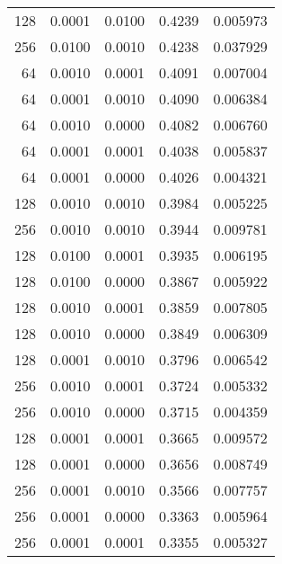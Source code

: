 \begin{tabular}{rrrrr}
 128 &  0.0001 &  0.0100 &  0.4239 &  0.005973 \\
 256 &  0.0100 &  0.0010 &  0.4238 &  0.037929 \\
  64 &  0.0010 &  0.0001 &  0.4091 &  0.007004 \\
  64 &  0.0001 &  0.0010 &  0.4090 &  0.006384 \\
  64 &  0.0010 &  0.0000 &  0.4082 &  0.006760 \\
  64 &  0.0001 &  0.0001 &  0.4038 &  0.005837 \\
  64 &  0.0001 &  0.0000 &  0.4026 &  0.004321 \\
 128 &  0.0010 &  0.0010 &  0.3984 &  0.005225 \\
 256 &  0.0010 &  0.0010 &  0.3944 &  0.009781 \\
 128 &  0.0100 &  0.0001 &  0.3935 &  0.006195 \\
 128 &  0.0100 &  0.0000 &  0.3867 &  0.005922 \\
 128 &  0.0010 &  0.0001 &  0.3859 &  0.007805 \\
 128 &  0.0010 &  0.0000 &  0.3849 &  0.006309 \\
 128 &  0.0001 &  0.0010 &  0.3796 &  0.006542 \\
 256 &  0.0010 &  0.0001 &  0.3724 &  0.005332 \\
 256 &  0.0010 &  0.0000 &  0.3715 &  0.004359 \\
 128 &  0.0001 &  0.0001 &  0.3665 &  0.009572 \\
 128 &  0.0001 &  0.0000 &  0.3656 &  0.008749 \\
 256 &  0.0001 &  0.0010 &  0.3566 &  0.007757 \\
 256 &  0.0001 &  0.0000 &  0.3363 &  0.005964 \\
 256 &  0.0001 &  0.0001 &  0.3355 &  0.005327 \\
\bottomrule
\end{tabular}
